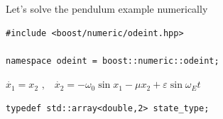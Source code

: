 \begin{frame}[fragile]
\begin{columns}[T]
\begin{column}{0.65\textwidth}
{ }

   
  \end{column}
\end{columns}

 

\end{frame}







\begin{frame}[fragile]

\centerline{ \Large Let's solve the pendulum example numerically}

\vspace{2ex}
\begin{lstlisting}
#include <boost/numeric/odeint.hpp>

namespace odeint = boost::numeric::odeint;
\end{lstlisting}

\vspace{2ex}

\centerline{$\dot{x_1} = x_2 \,\,\text{,} \quad \dot{x_2} = - \omega_0 \sin x_1 - \mu x_2 + \varepsilon \sin \omega_E t$}

\vspace{2ex}
\begin{lstlisting}
typedef std::array<double,2> state_type;
\end{lstlisting}

\end{frame}

